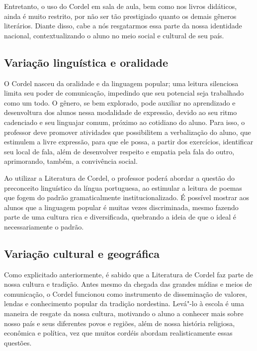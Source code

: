 \documentclass[12pt]{extarticle}
\begin{document}
Entretanto, o uso do Cordel em sala de aula, bem como nos livros
didáticos, ainda é muito restrito, por não ser tão prestigiado quanto os
demais gêneros literários. Diante disso, cabe a nós resgatarmos essa
parte da nossa identidade nacional, contextualizando o aluno no meio
social e cultural de seu país.


\subsection{Variação linguística e oralidade}

O Cordel nasceu da oralidade e da linguagem popular; uma leitura
silenciosa limita seu poder de comunicação, impedindo que seu potencial
seja trabalhado como um todo. O gênero, se bem explorado, pode auxiliar
no aprendizado e desenvoltura dos alunos nessa modalidade de expressão,
devido ao seu ritmo cadenciado e seu linguajar comum, próximo ao
cotidiano do aluno. Para isso, o professor deve promover atividades que
possibilitem a verbalização do aluno, que estimulem a livre expressão,
para que ele possa, a partir dos exercícios, identificar seu local de
fala, além de desenvolver respeito e empatia pela fala do outro,
aprimorando, também, a convivência social.

Ao utilizar a Literatura de Cordel, o professor poderá abordar a questão
do preconceito linguístico da língua portuguesa, ao estimular a leitura
de poemas que fogem do padrão gramaticalmente institucionalizado. É
possível mostrar aos alunos que a linguagem popular é muitas vezes
discriminada, mesmo fazendo parte de uma cultura rica e diversificada,
quebrando a ideia de que o ideal é necessariamente o padrão.

\subsection{Variação cultural e geográfica}

Como explicitado anteriormente, é sabido que a Literatura de Cordel faz
parte de nossa cultura e tradição. Antes mesmo da chegada das grandes
mídias e meios de comunicação, o Cordel funcionou como instrumento de
disseminação de valores, lendas e conhecimento popular da tradição
nordestina. Levá"-lo à escola é uma maneira de resgate da nossa cultura,
motivando o aluno a conhecer mais sobre nosso país e seus diferentes
povos e regiões, além de nossa história religiosa, econômica e política,
vez que muitos cordéis abordam realisticamente essas questões.
\end{document}
